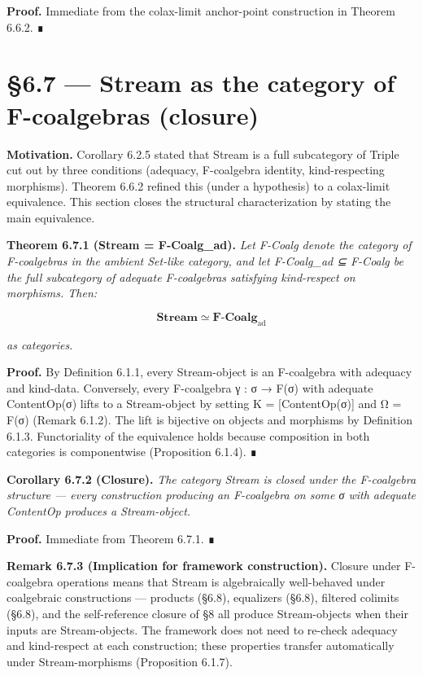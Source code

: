 \documentclass[11pt, openany]{book}
\newcommand{\sectionbreak}{\clearpage}
\begin{document}
\textbf{Proof.} Immediate from the colax-limit anchor-point construction in Theorem 6.6.2. ∎

\sectionbreak

\section{§6.7 --- Stream as the category of F-coalgebras (closure)}

\textbf{Motivation.} Corollary 6.2.5 stated that Stream is a full subcategory of Triple cut out by three conditions (adequacy, F-coalgebra identity, kind-respecting morphisms). Theorem 6.6.2 refined this (under a hypothesis) to a colax-limit equivalence. This section closes the structural characterization by stating the main equivalence.

\textbf{Theorem 6.7.1 (Stream = F-Coalg\_\allowbreak{}ad).} \textit{Let F-Coalg denote the category of F-coalgebras in the ambient Set-like category, and let F-Coalg\_\allowbreak{}ad ⊆ F-Coalg be the full subcategory of adequate F-coalgebras satisfying kind-respect on morphisms. Then:}

\[
\mathbf{Stream} \simeq \mathbf{F\text{-}Coalg}_{\mathrm{ad}}
\]

\textit{as categories.}

\textbf{Proof.} By Definition 6.1.1, every Stream-object is an F-coalgebra with adequacy and kind-data. Conversely, every F-coalgebra γ : σ → F(σ) with adequate ContentOp(σ) lifts to a Stream-object by setting K = [ContentOp(σ)] and Ω = F(σ) (Remark 6.1.2). The lift is bijective on objects and morphisms by Definition 6.1.3. Functoriality of the equivalence holds because composition in both categories is componentwise (Proposition 6.1.4). ∎

\textbf{Corollary 6.7.2 (Closure).} \textit{The category Stream is closed under the F-coalgebra structure --- every construction producing an F-coalgebra on some σ with adequate ContentOp produces a Stream-object.}

\textbf{Proof.} Immediate from Theorem 6.7.1. ∎

\textbf{Remark 6.7.3 (Implication for framework construction).} Closure under F-coalgebra operations means that Stream is algebraically well-behaved under coalgebraic constructions --- products (§6.8), equalizers (§6.8), filtered colimits (§6.8), and the self-reference closure of §8 all produce Stream-objects when their inputs are Stream-objects. The framework does not need to re-check adequacy and kind-respect at each construction; these properties transfer automatically under Stream-morphisms (Proposition 6.1.7).
\end{document}
